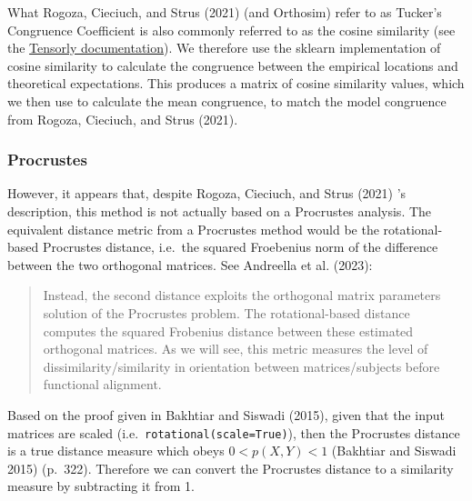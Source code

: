 \documentclass[
  default,
]{sn-jnl}
\begin{document}
What Rogoza, Cieciuch, and Strus (2021) (and Orthosim) refer to as
Tucker's Congruence Coefficient is also commonly referred to as the
cosine similarity (see the
\href{https://tensorly.org/stable/modules/generated/tensorly.metrics.factors.congruence_coefficient.html}{Tensorly
documentation}). We therefore use the sklearn implementation of cosine
similarity to calculate the congruence between the empirical locations
and theoretical expectations. This produces a matrix of cosine
similarity values, which we then use to calculate the mean congruence,
to match the model congruence from Rogoza, Cieciuch, and Strus (2021).

\subsubsection{Procrustes}\label{procrustes}

However, it appears that, despite Rogoza, Cieciuch, and Strus (2021) 's
description, this method is not actually based on a Procrustes analysis.
The equivalent distance metric from a Procrustes method would be the
rotational-based Procrustes distance, i.e.~the squared Froebenius norm
of the difference between the two orthogonal matrices. See Andreella et
al. (2023):

\begin{quote}
Instead, the second distance exploits the orthogonal matrix parameters
solution of the Procrustes problem. The rotational-based distance
computes the squared Frobenius distance between these estimated
orthogonal matrices. As we will see, this metric measures the level of
dissimilarity/similarity in orientation between matrices/subjects before
functional alignment.
\end{quote}

Based on the proof given in Bakhtiar and Siswadi (2015), given that the
input matrices are scaled (i.e.~\texttt{rotational(scale=True)}), then
the Procrustes distance is a true distance measure which obeys
\(0 < p(X, Y) < 1\) (Bakhtiar and Siswadi 2015) (p.~322). Therefore we
can convert the Procrustes distance to a similarity measure by
subtracting it from 1.
\end{document}
